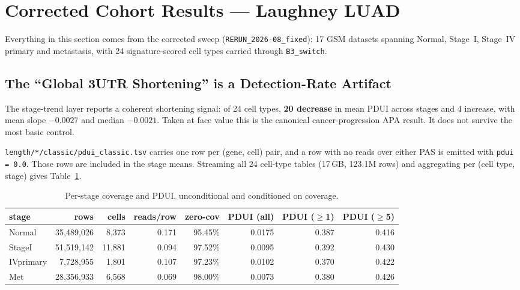 \documentclass[11pt,a4paper]{article}
\begin{document}
\section{Corrected Cohort Results --- Laughney LUAD}
\label{sec:corrected}

Everything in this section comes from the corrected sweep
(\texttt{RERUN\_2026-08\_fixed}): 17 GSM datasets spanning Normal, Stage~I,
Stage~IV primary and metastasis, with 24 signature-scored cell types carried
through \texttt{B3\_switch}.

\subsection{The ``Global 3\textquotesingle{}UTR Shortening'' is a Detection-Rate Artifact}

The stage-trend layer reports a coherent shortening signal: of 24 cell types,
\textbf{20 decrease} in mean PDUI across stages and 4 increase, with mean slope
$-0.0027$ and median $-0.0021$. Taken at face value this is the canonical
cancer-progression APA result. It does not survive the most basic control.

\texttt{length/*/classic/pdui\_classic.tsv} carries one row per (gene, cell) pair,
and a row with no reads over either PAS is emitted with \texttt{pdui = 0.0}. Those
rows are included in the stage means. Streaming all 24 cell-type tables (17\,GB,
123.1M rows) and aggregating per (cell type, stage) gives Table~\ref{tab:depth}.

\begin{table}[htbp]
  \centering
  \small
  \begin{tabular}{lrrrrrrr}
    \toprule
    stage & rows & cells & reads/row & zero-cov & PDUI (all) & PDUI ($\geq$1) & PDUI ($\geq$5) \\
    \midrule
    Normal    & 35,489,026 &  8,373 & 0.171 & 95.45\% & 0.0175 & 0.387 & 0.416 \\
    StageI    & 51,519,142 & 11,881 & 0.094 & 97.52\% & 0.0095 & 0.392 & 0.430 \\
    IVprimary &  7,728,955 &  1,801 & 0.107 & 97.23\% & 0.0102 & 0.370 & 0.422 \\
    Met       & 28,356,933 &  6,568 & 0.069 & 98.00\% & 0.0073 & 0.380 & 0.426 \\
    \bottomrule
  \end{tabular}
  \caption{Per-stage coverage and PDUI, unconditional and conditioned on coverage.}
  \label{tab:depth}
\end{table}
\end{document}
